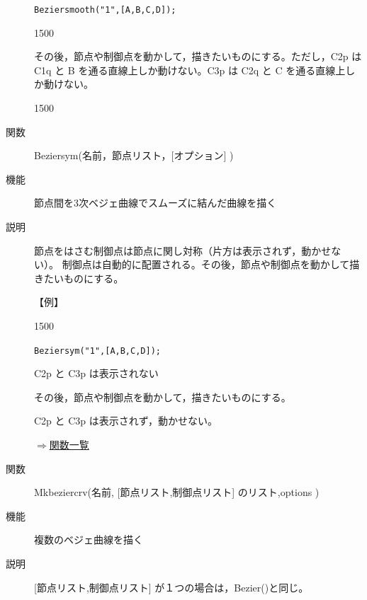 \documentclass[papersize,a4paper,12pt,uplatex]{jsarticle}
\begin{document}
\begin{description}
\verb|Beziersmooth("1",[A,B,C,D]);|

\begin{layer}{150}{0}
\end{layer}

\vspace{40mm}
その後，節点や制御点を動かして，描きたいものにする。ただし，C2p は C1q と B を通る直線上しか動けない。C3p は C2q と C を通る直線上しか動けない。

\begin{layer}{150}{0}
\end{layer}

\vspace{35mm}

\vspace{\baselineskip}
\hypertarget{beziersym}{}
\item[関数]Beziersym(名前，節点リスト，[オプション] )
\item[機能]節点間を3次ベジェ曲線でスムーズに結んだ曲線を描く
\item[説明]節点をはさむ制御点は節点に関し対称（片方は表示されず，動かせない）。
制御点は自動的に配置される。その後，節点や制御点を動かして描きたいものにする。

\vspace{\baselineskip}
【例】

\begin{layer}{150}{0}
\end{layer}

\verb|Beziersym("1",[A,B,C,D]);|

C2p と C3p は表示されない

\vspace{25mm}

その後，節点や制御点を動かして，描きたいものにする。

C2p と C3p は表示されず，動かせない。

\begin{center}  \end{center}

\begin{flushright}\hyperlink{functionlist}{$\Rightarrow$関数一覧}\end{flushright}
\hypertarget{mkbeziercrv}{}
\item[関数]Mkbeziercrv(名前, [節点リスト,制御点リスト] のリスト,options )
\item[機能]複数のベジェ曲線を描く
\item[説明][節点リスト,制御点リスト] が１つの場合は，Bezier()と同じ。


\end{description}
\end{document}

